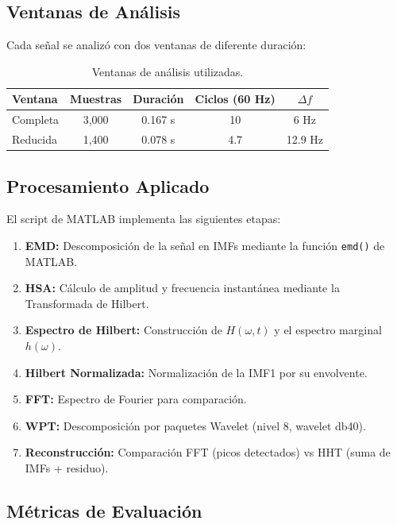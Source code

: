 \documentclass[12pt,a4paper]{article}
\begin{document}
\subsection{Ventanas de Análisis}

Cada señal se analizó con dos ventanas de diferente duración:

\begin{table}[H]
\centering
\caption{Ventanas de análisis utilizadas.}
\begin{tabular}{@{}lcccc@{}}
\toprule
\textbf{Ventana} & \textbf{Muestras} & \textbf{Duración} & \textbf{Ciclos (60 Hz)} & \textbf{$\Delta f$} \\
\midrule
Completa & 3{,}000 & 0.167 s & 10 & 6 Hz \\
Reducida & 1{,}400 & 0.078 s & 4.7 & 12.9 Hz \\
\bottomrule
\end{tabular}
\label{tab:ventanas}
\end{table}

\subsection{Procesamiento Aplicado}

El script de MATLAB implementa las siguientes etapas:
\begin{enumerate}
    \item \textbf{EMD:} Descomposición de la señal en IMFs mediante la función \texttt{emd()} de MATLAB.
    \item \textbf{HSA:} Cálculo de amplitud y frecuencia instantánea mediante la Transformada de Hilbert.
    \item \textbf{Espectro de Hilbert:} Construcción de $H(\omega,t)$ y el espectro marginal $h(\omega)$.
    \item \textbf{Hilbert Normalizada:} Normalización de la IMF1 por su envolvente.
    \item \textbf{FFT:} Espectro de Fourier para comparación.
    \item \textbf{WPT:} Descomposición por paquetes Wavelet (nivel 8, wavelet db40).
    \item \textbf{Reconstrucción:} Comparación FFT (picos detectados) vs HHT (suma de IMFs + residuo).
\end{enumerate}

\subsection{Métricas de Evaluación}
\end{document}
